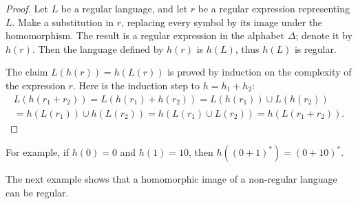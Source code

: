 

\setcounter{section}{3}
\setcounter{subsection}{3}
\setcounter{dfn}{12}

\begin{proof}
Let $L$ be a regular language, and let $r$ be a regular expression representing $L$.
Make a substitution in $r$, replacing every symbol by its image under the homomorphism.
The result is a regular expression in the alphabet $\Delta$; denote it by $h(r)$.
Then the language defined by $h(r)$ is $h(L)$, thus $h(L)$ is regular.

The claim $L(h(r)) = h(L(r))$ is proved by induction on the complexity of the expression $r$.
Here is the induction step to $h = h_1 + h_2$:
\begin{multline*}
L(h(r_1+r_2)) = L(h(r_1)+h(r_2)) = L(h(r_1)) \cup L(h(r_2))\\
= h(L(r_1)) \cup h(L(r_2)) = h(L(r_1) \cup L(r_2)) = h(L(r_1+r_2)).
\end{multline*}
\end{proof}

For example, if $h(0) = 0$ and $h(1) = 10$, then $h((0+1)^*) = (0+10)^*$.

The next example shows that a homomorphic image of a non-regular language can be regular.



